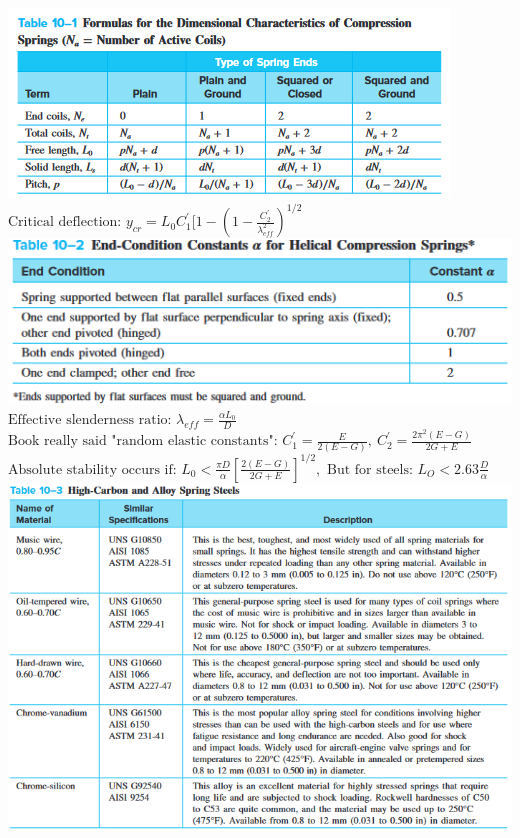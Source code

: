 \documentclass[11pt, fleqn]{article}
\begin{document}
\includegraphics[scale=1]{Springs/Tab10-1.png}\\
$\text{Critical deflection: } y_{cr} = L_0C^{'}_1[1-(1-\frac{C^{'}_2}{\lambda^2_{eff}})^{1/2}$\\
\includegraphics[scale=0.8]{Springs/Tab10-2.png}\\
$\text{Effective slenderness ratio: } \lambda_{eff} = \frac{\alpha L_0}{D}$\\
$\text{Book really said "random elastic constants": } C^{'}_1 = \frac{E}{2(E-G)}, \: C^{'}_2 = \frac{2\pi^2(E-G)}{2G+E}$\\
$\text{Absolute stability occurs if: } L_0 < \frac{\pi D}{\alpha}[\frac{2(E-G)}{2G+E}]^{1/2}, \text{ But for steels: } L_O < 2.63\frac{D}{\alpha}$\\
\includegraphics[scale=0.7]{Springs/Tab10-3.png}\\
\end{document}
